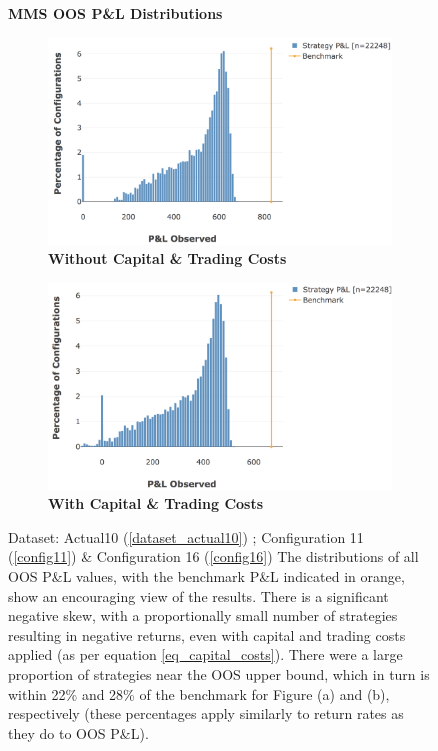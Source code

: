\documentclass[a4paper,11pt,oneside]{article}
\theoremstyle{plain}
\theoremstyle{definition}
\begin{document}
	
	\begin{figure}[H]
		\centering
		\textbf{MMS OOS P\&L Distributions}
		\begin{subfigure}{.44\textwidth}
			\centering 
			\includegraphics[scale=0.312]{images/results/8_8_mms/profits_nocost.png} 
			\caption{\textbf{Without Capital \& Trading Costs}}
			\label{figure-results_pl_pdf_nocapital}
		\end{subfigure}%
		\begin{subfigure}{.5\textwidth}
			\includegraphics[scale=0.313]{images/results/8_8_mms/profits_cost.png} 
			\caption{\textbf{With Capital \& Trading Costs}}
			\label{figure-results_pl_pdf_cost_capital}
		\end{subfigure}
		\caption[MMS OOS P\&L Distributions]{Dataset: Actual10 (\ref{dataset_actual10}) ; Configuration 11 (\ref{config11}) \&  Configuration 16 (\ref{config16})
			\newline The distributions of all OOS P\&L values, with the benchmark P\&L indicated in orange, show an encouraging view of the results. There is a significant negative skew, with a proportionally small number of strategies resulting in negative returns, even with capital and trading costs applied (as per equation \eqref{eq_capital_costs}). There were a large proportion of strategies near the OOS upper bound, which in turn is within 22\% and 28\% of the benchmark for Figure (a) and (b), respectively (these percentages apply similarly to return rates as they do to OOS P\&L).
		}
		\label{results_pl_pdf_cost}
	\end{figure}
	
\end{document}
